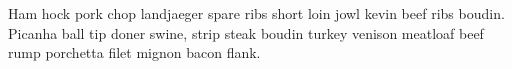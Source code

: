 Ham hock pork chop landjaeger spare ribs short loin jowl kevin beef ribs boudin. Picanha ball tip doner swine, strip steak boudin turkey venison meatloaf beef rump porchetta filet mignon bacon flank. \ ~ 